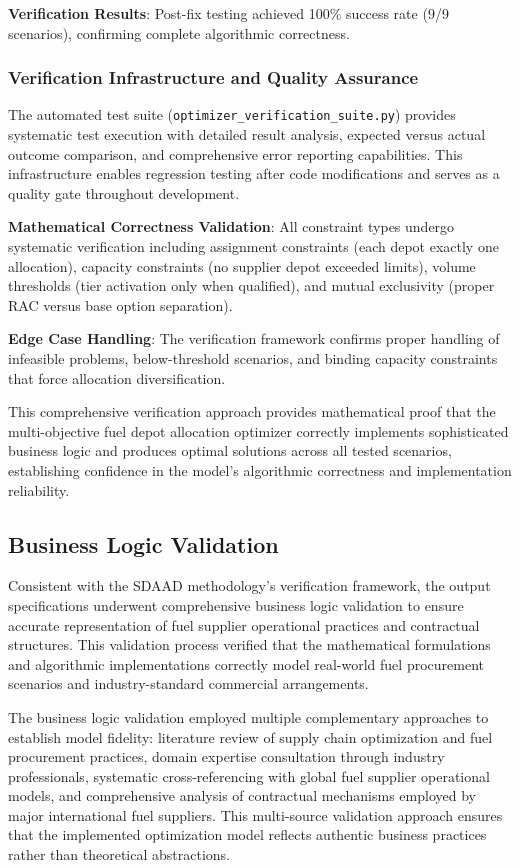 \textbf{Verification Results}: Post-fix testing achieved 100\% success rate (9/9 scenarios), confirming complete algorithmic correctness.

\subsubsection{Verification Infrastructure and Quality Assurance}

The automated test suite (\texttt{optimizer\_verification\_suite.py}) provides systematic test execution with detailed result analysis, expected versus actual outcome comparison, and comprehensive error reporting capabilities. This infrastructure enables regression testing after code modifications and serves as a quality gate throughout development.

\textbf{Mathematical Correctness Validation}: All constraint types undergo systematic verification including assignment constraints (each depot exactly one allocation), capacity constraints (no supplier depot exceeded limits), volume thresholds (tier activation only when qualified), and mutual exclusivity (proper RAC versus base option separation).

\textbf{Edge Case Handling}: The verification framework confirms proper handling of infeasible problems, below-threshold scenarios, and binding capacity constraints that force allocation diversification.

This comprehensive verification approach provides mathematical proof that the multi-objective fuel depot allocation optimizer correctly implements sophisticated business logic and produces optimal solutions across all tested scenarios, establishing confidence in the model's algorithmic correctness and implementation reliability.

\subsection{Business Logic Validation}

Consistent with the SDAAD methodology's verification framework, the output specifications underwent comprehensive business logic validation to ensure accurate representation of fuel supplier operational practices and contractual structures. This validation process verified that the mathematical formulations and algorithmic implementations correctly model real-world fuel procurement scenarios and industry-standard commercial arrangements.

The business logic validation employed multiple complementary approaches to establish model fidelity: literature review of supply chain optimization and fuel procurement practices, domain expertise consultation through industry professionals, systematic cross-referencing with global fuel supplier operational models, and comprehensive analysis of contractual mechanisms employed by major international fuel suppliers. This multi-source validation approach ensures that the implemented optimization model reflects authentic business practices rather than theoretical abstractions.

